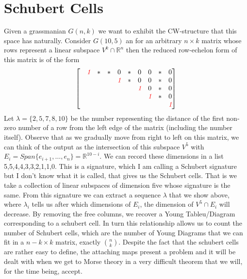 \documentclass[40pt]{article}
\newcommand{\R}{\mathbb{R}}
\newcommand{\note}[1]{\textcolor{red}{\emph{#1}}}
\begin{document}
		\section{Schubert Cells}
		Given a grassmanian $G(n,k)$ we want to exhibit the CW-structure that this space has naturally. Consider $G(10,5)$ an for an arbitrary $n \times k$ matrix whose rows represent a linear subspace $V^k \cap \R^n$ then the reduced row-echelon form of this matrix is of the form 
		\[
		\begin{bmatrix}
			& \note{1} & * & * & 0 & * & 0 & 0 & * & 0 \\
			&  &  &  & \note{1} & * & 0 & 0 & * & 0 \\	
			&  &  &  &  &  & \note{1} & 0 & * & 0 \\
			&  &  &  &  & &  & \note{1} & * & 0 \\
			&  &  &  &  &  &  &  &  & \note{1} \\
		\end{bmatrix}
		\]
		Let $\lambda = \{2, 5, 7,8,10\}$ be the number representing the distance of the first non-zero number of a row from the left edge of the matrix (including the number itself). 	Observe that as we gradually move from right to left on this matrix, we can think of the output as the intersection of this subspace $V^5$ with $E_i = Span\{e_{i + 1}, \dots, e_n\} = \R^{10-i}$. We can record these dimensions in a list 5,5,4,4,3,3,2,1,1,0. This is a signature, which I am calling a Schubert signature but I don't know what it is called, that gives us the Schubert cells. That is we take a collection of linear subspaces of dimension five whose signature is the same. From this signature we can extract a sequence $\lambda$ that we show above, where $\lambda_i$ tells us after which dimensions of $E_i$, the dimension of $V^5 \cap E_i$ will decrease. By removing the free columns, we recover a Young Tableu/Diagram corresponding to a schubert cell. In turn this relationship allows us to count the number of Schubert cells, which are the number of Young Diagrams that we can fit in a $n-k \times k$ matrix, exactly $n \choose k$. Despite the fact that the schubert cells are rather easy to define, the attaching maps present a problem and it will be dealt with when we get to Morse theory in a very difficult theorem that we will, for the time being, accept.
		
\end{document}
